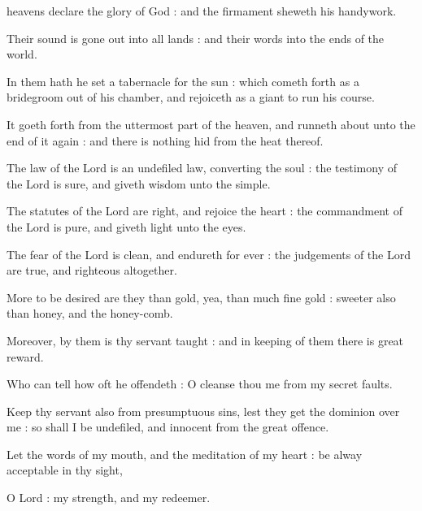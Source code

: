

 heavens declare the glory of God : and the firmament sheweth his handywork.\par
{}
Their sound is gone out into all lands : and their words into the ends of the world.\par
{}In them hath he set a tabernacle for the sun : which cometh forth as a bridegroom out of his chamber, and rejoiceth as a giant to run his course.\par
{}It goeth forth from the uttermost part of the heaven, and runneth about unto the end of it again : and there is nothing hid from the heat thereof.\par
{}The law of the Lord is an undefiled law, converting the soul : the testimony of the Lord is sure, and giveth wisdom unto the simple.\par
{}The statutes of the Lord are right, and rejoice the heart : the commandment of the Lord is pure, and giveth light unto the eyes.\par
{}The fear of the Lord is clean, and endureth for ever : the judgements of the Lord are true, and righteous altogether.\par
{}More to be desired are they than gold, yea, than much fine gold : sweeter also than honey, and the honey-comb.\par
{}Moreover, by them is thy servant taught : and in keeping of them there is great reward.\par
{}Who can tell how oft he offendeth : O cleanse thou me from my secret faults.\par
{}Keep thy servant also from presumptuous sins, lest they get the dominion over me : so shall I be undefiled, and innocent from the great offence.\par
{}Let the words of my mouth, and the meditation of my heart : be alway acceptable in thy sight,\par
{}O Lord : my strength, and my redeemer.\par


